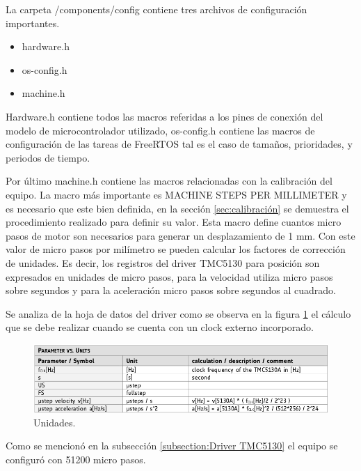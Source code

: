La carpeta /components/config contiene tres archivos de configuración importantes.
\begin{itemize}
\item hardware.h
\item os-config.h
\item machine.h
\end{itemize}

Hardware.h contiene todos las macros referidas a los pines de conexión del modelo de microcontrolador utilizado, os-config.h contiene las macros de configuración de las tareas de FreeRTOS tal es el caso de tamaños, prioridades, y periodos de tiempo.

Por último machine.h contiene las macros relacionadas con la calibración del equipo. La macro más importante es MACHINE STEPS PER MILLIMETER y es necesario que este bien definida, en la sección \ref{sec:calibración} se demuestra el procedimiento realizado para definir su valor. Esta macro define cuantos micro pasos de motor son necesarios para generar un desplazamiento de 1 mm. Con este valor de micro pasos por milímetro se pueden calcular los factores de corrección de unidades. Es decir, los registros del driver TMC5130 para posición son expresados en unidades de micro pasos, para la velocidad utiliza micro pasos sobre segundos y para la aceleración micro pasos sobre segundos al cuadrado.

Se analiza de la hoja de datos del driver \citep{3_web_trinamic_producto} como se observa en la figura \ref{fig:unidades} el cálculo que se debe realizar cuando se cuenta con un clock externo incorporado.

\begin{figure}[h!]
	\centering
	\includegraphics[width=1\textwidth]{./Figures/unit.png}
	\caption{Unidades.}
	\label{fig:unidades}
\end{figure}


Como se mencionó en la subsección \ref{subsection:Driver TMC5130} el equipo se configuró con 51200 micro pasos.  
 
 

